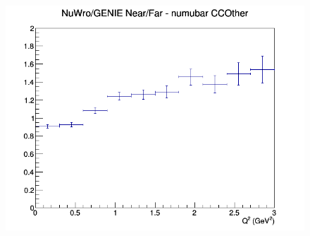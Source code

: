 \begin{figure}[h]
\endminipage
{}
\includegraphics[width=\linewidth]{eff_Q2/GAr/ratios/CCOther_NuWro_GENIE_numubar_NF_Q2.png}
\endminipage
\newline
\end{figure}
\clearpage
